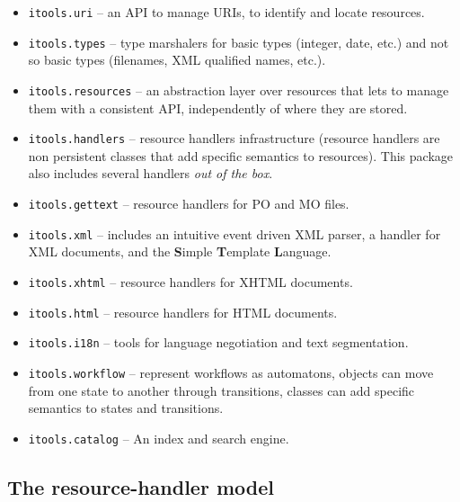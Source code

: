 \begin{itemize}
  \item {\tt itools.uri} -- an API to manage URIs, to identify and locate
    resources.

  \item {\tt itools.types} -- type marshalers for basic types (integer, date,
    etc.) and not so basic types (filenames, XML qualified names, etc.).

  \item {\tt itools.resources} -- an abstraction layer over resources that
    lets to manage them with a consistent API, independently of where they
    are stored.

  \item {\tt itools.handlers} -- resource handlers infrastructure (resource
    handlers are non persistent classes that add specific semantics to
    resources). This package also includes several handlers {\em out of the
    box}.

  \item {\tt itools.gettext} -- resource handlers for PO and MO files.

  \item {\tt itools.xml} -- includes an intuitive event driven XML parser,
    a handler for XML documents, and the {\bf S}imple {\bf T}emplate
    {\bf L}anguage.

  \item {\tt itools.xhtml} -- resource handlers for XHTML documents.

  \item {\tt itools.html} -- resource handlers for HTML documents.

  \item {\tt itools.i18n} -- tools for language negotiation and text
    segmentation.

  \item {\tt itools.workflow} -- represent workflows as automatons, objects
    can move from one state to another through transitions, classes can add
    specific semantics to states and transitions.

  \item {\tt itools.catalog} -- An index and search engine.
\end{itemize}


\subsection{The resource-handler model}

